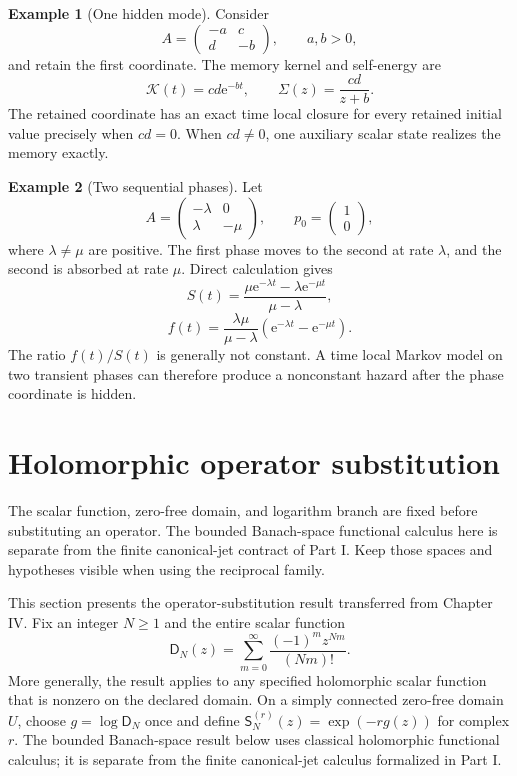 \documentclass[11pt,letterpaper]{article}
\theoremstyle{plain}
\theoremstyle{plain}
\theoremstyle{plain}
\theoremstyle{definition}
\theoremstyle{definition}
\theoremstyle{definition}
\newtheorem{example}[example]{Example}
\theoremstyle{definition}
\theoremstyle{definition}
\theoremstyle{remark}
\theoremstyle{remark}
\theoremstyle{remark}
\theoremstyle{remark}
\theoremstyle{remark}
\theoremstyle{remark}
\newcommand{\Dfun}{\mathsf D}
\newcommand{\Sfun}{\mathsf S}
\newcommand{\Kcal}{\mathcal K}
\newcommand{\e}{\mathrm e}
\let\KomorebiPrimitiveMathcal\mathcal
\renewcommand{\mathcal}[1]{{\KomorebiPrimitiveMathcal{#1}}}
\let\KomorebiPrimitivemathsf\mathsf
\renewcommand{\mathsf}[1]{{\KomorebiPrimitivemathsf{#1}}}
\let\KomorebiPrimitivemathrm\mathrm
\renewcommand{\mathrm}[1]{{\KomorebiPrimitivemathrm{#1}}}
\begin{document}
\begin{example}[One hidden mode]\label{earlier:record:029}\label{earlier:ex:one_hidden_mode}
Consider
\[
A=
\begin{pmatrix}
-a&c\\
d&-b
\end{pmatrix},
\qquad
a,b>0,
\]
and retain the first coordinate. The memory kernel and self-energy are
\[
\Kcal(t)=cd\e^{-bt},
\qquad
\Sigma(z)=\frac{cd}{z+b}.
\]
The retained coordinate has an exact time local closure for every retained initial value precisely when \(cd=0\). When \(cd\neq0\), one auxiliary scalar state realizes the memory exactly.
\end{example}

\begin{example}[Two sequential phases]\label{earlier:record:030}\label{earlier:ex:two_phase_survival}
Let
\[
A=
\begin{pmatrix}
-\lambda&0\\
\lambda&-\mu
\end{pmatrix},
\qquad
p_0=
\begin{pmatrix}1\\0\end{pmatrix},
\]
where \(\lambda\neq\mu\) are positive. The first phase moves to the second at rate \(\lambda\), and the second is absorbed at rate \(\mu\). Direct calculation gives
\[
S(t)=
\frac{\mu\e^{-\lambda t}-\lambda\e^{-\mu t}}{\mu-\lambda},
\]
\[
f(t)=
\frac{\lambda\mu}{\mu-\lambda}
\left(\e^{-\lambda t}-\e^{-\mu t}\right).
\]
The ratio \(f(t)/S(t)\) is generally not constant. A time local Markov model on two transient phases can therefore produce a nonconstant hazard after the phase coordinate is hidden.
\end{example}

\FloatBarrier
\section{Holomorphic operator substitution}\label{migration:section:01}\label{migration:sec:operator_substitution}
\begin{readerroadmap}
The scalar function, zero-free domain, and logarithm branch are fixed before substituting an operator. The bounded Banach-space functional calculus here is separate from the finite canonical-jet contract of Part I. Keep those spaces and hypotheses visible when using the reciprocal family.
\end{readerroadmap}


This section presents the operator-substitution result transferred from Chapter IV. Fix an integer $N\geq1$ and the entire scalar function
\[
\Dfun_N(z)=\sum_{m=0}^{\infty}\frac{(-1)^m z^{Nm}}{(Nm)!}.
\]
More generally, the result applies to any specified holomorphic scalar function that is nonzero on the declared domain. On a simply connected zero-free domain $U$, choose $g=\log\Dfun_N$ once and define $\Sfun_N^{(r)}(z)=\exp(-r g(z))$ for complex $r$. The bounded Banach-space result below uses classical holomorphic functional calculus; it is separate from the finite canonical-jet calculus formalized in Part I.
\end{document}
